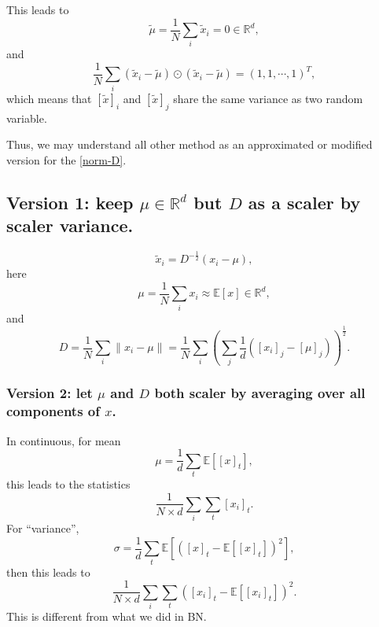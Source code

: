 This leads to
\begin{equation}\label{key}
\tilde \mu = \frac{1}{N} \sum_{i} \tilde x_i = 0 \in \mathbb{R}^d,
\end{equation}
and 
\begin{equation}\label{key}
 \frac{1}{N} \sum_{i} (\tilde x_i - \tilde \mu) \odot (\tilde x_i - \tilde \mu) = (1,1,\cdots,1)^T,
\end{equation}
which means that $[\tilde x]_i$ and $[\tilde x]_j$ share the same variance as two random variable.


Thus, we may understand all other method as an approximated or modified version for the \eqref{norm-D}.

\subsection{Version 1:  keep $\mu \in \mathbb{R}^d$ but $D$ as a scaler by scaler variance.}
\begin{equation}\label{norm-D}
\tilde x_i = D^{-\frac{1}{2}}{(x_i - \mu)},
\end{equation}
here 
\begin{equation}\label{key}
\mu = \frac{1}{N} \sum_{i} x_i \approx \mathbb{E}[x] \in \mathbb{R}^d,
\end{equation}
and
\begin{equation}\label{key}
D = \frac{1}{N}  \sum_{i} \|x_i - \mu\| = \frac{1}{N} \sum_{i} ( \sum_{j} \frac{1}{d}([x_i]_j - [\mu]_j) )^{\frac{1}{2}}.
\end{equation}

\subsubsection{Version 2: let $\mu$  and $D$ both scaler by averaging over all components of $x$.}
In continuous, for mean
\begin{equation}\label{key}
\mu = \frac{1}{d} \sum_t \mathbb{E}[[x]_t],
\end{equation}
this leads to the statistics 
\begin{equation}\label{key}
\frac{1}{N \times d} \sum_{i} \sum_{t} [x_i]_t.
\end{equation}
For ``variance'',
\begin{equation}\label{key}
\sigma =  \frac{1}{d} \sum_t \mathbb{E}[([x]_t - \mathbb{E}[[x]_t])^2],
\end{equation}
then this leads to
\begin{equation}\label{key}
\frac{1}{N \times d} \sum_{i} \sum_{t} ([x_i]_t - \mathbb{E}[[x_i]_t])^2.
\end{equation}
This is different from what we did in BN.

